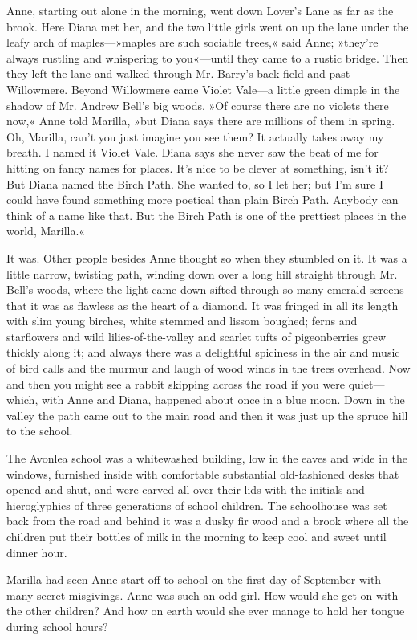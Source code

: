 Anne, starting out alone in the morning, went down Lover’s Lane as far as the brook. Here Diana met her, and the two little girls went on up the lane under the leafy arch of maples—»maples are such sociable trees,« said Anne; »they’re always rustling and whispering to you«—until they came to a rustic bridge. Then they left the lane and walked through Mr. Barry’s back field and past Willowmere. Beyond Willowmere came Violet Vale—a little green dimple in the shadow of Mr. Andrew Bell’s big woods. »Of course there are no violets there now,« Anne told Marilla, »but Diana says there are millions of them in spring. Oh, Marilla, can’t you just imagine you see them? It actually takes away my breath. I named it Violet Vale. Diana says she never saw the beat of me for hitting on fancy names for places. It’s nice to be clever at something, isn’t it? But Diana named the Birch Path. She wanted to, so I let her; but I’m sure I could have found something more poetical than plain Birch Path. Anybody can think of a name like that. But the Birch Path is one of the prettiest places in the world, Marilla.«

It was. Other people besides Anne thought so when they stumbled on it. It was a little narrow, twisting path, winding down over a long hill straight through Mr. Bell’s woods, where the light came down sifted through so many emerald screens that it was as flawless as the heart of a diamond. It was fringed in all its length with slim young birches, white stemmed and lissom boughed; ferns and starflowers and wild lilies-of-the-valley and scarlet tufts of pigeonberries grew thickly along it; and always there was a delightful spiciness in the air and music of bird calls and the murmur and laugh of wood winds in the trees overhead. Now and then you might see a rabbit skipping across the road if you were quiet—which, with Anne and Diana, happened about once in a blue moon. Down in the valley the path came out to the main road and then it was just up the spruce hill to the school.

The Avonlea school was a whitewashed building, low in the eaves and wide in the windows, furnished inside with comfortable substantial old-fashioned desks that opened and shut, and were carved all over their lids with the initials and hieroglyphics of three generations of school children. The schoolhouse was set back from the road and behind it was a dusky fir wood and a brook where all the children put their bottles of milk in the morning to keep cool and sweet until dinner hour.

Marilla had seen Anne start off to school on the first day of September with many secret misgivings. Anne was such an odd girl. How would she get on with the other children? And how on earth would she ever manage to hold her tongue during school hours?

